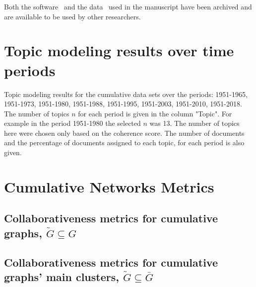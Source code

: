 \documentclass{article}
\theoremstyle{definition}
\begin{document}
Both the software~\cite{nikoleta_2017} and the data~\cite{pd_data_2018} used in
the manuscript have been archived and are available to be used by other
researchers.




\appendix

\section{Topic modeling results over time periods}\label{appendix:topics_per_year}

\begin{table}[!hbtp]
    \begin{center}
    \resizebox{\textwidth}{!}{
    }
    \end{center}
    \caption{Topic modeling results for the cumulative data sets over the
    periods: 1951-1965, 1951-1973, 1951-1980, 1951-1988, 1951-1995, 1951-2003, 1951-2010,
    1951-2018. The number of topics $n$ for each period is given in the column
    "Topic". For example in the period 1951-1980 the selected $n$ was 13. The
    number of topics here were chosen only based on the coherence score.
    The number of documents and the percentage of documents assigned to each
    topic, for each period is also given.}\label{table:topics_per_year}
\end{table}

\section{Cumulative Networks Metrics}\label{appendix:tables}

\subsection{Collaborativeness metrics for cumulative graphs, \(\tilde{G} \subseteq G\)}
\begin{table}[!hbtp]
    \centering
    \resizebox{.8\textwidth}{!}{
    }
\end{table}

\newpage

\subsection{Collaborativeness metrics for cumulative graphs' main clusters, \(\tilde{G} \subseteq \bar{G}\)}
\begin{table}[!hbtp]
    \centering
    \resizebox{.8\textwidth}{!}{
    }
\end{table}
\end{document}
